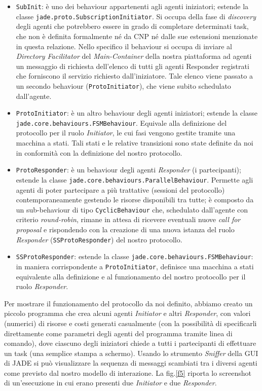 \documentclass[a4paper, 10pt, conference]{ieeeconf} %
\begin{document}
\begin{itemize}
\item{\texttt{SubInit}: è uno dei behaviour appartenenti agli agenti iniziatori; estende la classe \texttt{jade.proto.SubscriptionInitiator}. Si occupa della fase di \emph{discovery} degli agenti che potrebbero essere in grado di completare determinati task, che non è definita formalmente né da CNP né dalle sue estensioni menzionate in questa relazione. Nello specifico il behaviour si occupa di inviare al \emph{Directory Facilitator} del \emph{Main-Container} della nostra piattaforma ad agenti un messaggio di richiesta dell'elenco di tutti gli agenti Responder registrati che forniscono il servizio richiesto dall'iniziatore. Tale elenco viene passato a un secondo behaviour (\texttt{ProtoInitiator}), che viene subito schedulato dall'agente.}
\item{\texttt{ProtoInitiator}: è un altro behaviour degli agenti iniziatori; estende la classe \texttt{jade.core.behaviours.FSMBehaviour}. Equivale alla definizione del protocollo per il ruolo \emph{Initiator}, le cui fasi vengono gestite tramite una macchina a stati. Tali stati e le relative transizioni sono state definite da noi in conformità con la definizione del nostro protocollo.}
\item{\texttt{ProtoResponder}: è un behaviour degli agenti \emph{Responder} (i partecipanti); estende la classe \texttt{jade.core.behaviours.ParallelBehaviour}. Permette agli agenti di poter partecipare a più trattative (sessioni del protocollo) contemporaneamente gestendo le risorse disponibili tra tutte; è composto da un sub-behaviour di tipo \texttt{CyclicBehaviour} che, schedulato dall'agente con criterio \emph{round-robin}, rimane in attesa di ricevere eventuali nuove \emph{call for proposal} e rispondendo con la creazione di una nuova istanza del ruolo \emph{Responder} (\texttt{SSProtoResponder}) del nostro protocollo.}
\item{\texttt{SSProtoResponder}: estende la classe \texttt{jade.core.behaviours.FSMBehaviour}: in maniera corrispondente a \texttt{ProtoInitiator}, definisce una macchina a stati equivalente alla definizione e al funzionamento del nostro protocollo per il ruolo \emph{Responder}.}
\end{itemize}
Per mostrare il funzionamento del protocollo da noi definito, abbiamo creato un piccolo programma che crea alcuni agenti \emph{Initiator} e altri \emph{Responder}, con valori (numerici) di risorse e costi generati casualmente (con la possibilità di specificarli direttamente come parametri degli agenti del programma tramite linea di comando), dove ciascuno degli iniziatori chiede a tutti i partecipanti di effettuare un task (una semplice stampa a schermo). Usando lo strumento \emph{Sniffer} della GUI di JADE si può visualizzare la sequenza di messaggi scambiati tra i diversi agenti come previsto dal nostro modello di interazione. La fig.\ref{f5} riporta lo screenshot di un'esecuzione in cui erano presenti due \emph{Initiator} e due \emph{Responder}.
\end{document}
